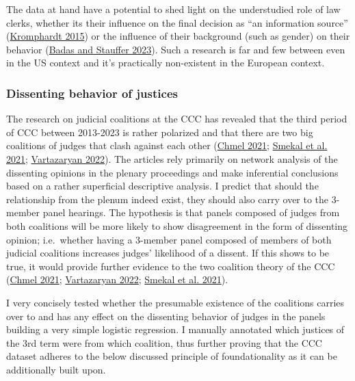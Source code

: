 \documentclass[
  11pt,
]{article}
\begin{document}
The data at hand have a potential to shed light on the understudied role
of law clerks, whether its their influence on the final decision as ``an
information source''
(\protect\hyperlink{ref-kromphardtUSSupremeCourt2015}{Kromphardt 2015})
or the influence of their background (such as gender) on their behavior
(\protect\hyperlink{ref-badasGenderAmbitionPotential2023}{Badas and
Stauffer 2023}). Such a research is far and few between even in the US
context and it's practically non-existent in the European context.

\hypertarget{dissenting-behavior-of-justices}{%
\subsubsection{Dissenting behavior of
justices}\label{dissenting-behavior-of-justices}}

The research on judicial coalitions at the CCC has revealed that the
third period of CCC between 2013-2023 is rather polarized and that there
are two big coalitions of judges that clash against each other
(\protect\hyperlink{ref-chmelCoOvlivnujeUstavni2021}{Chmel 2021};
\protect\hyperlink{ref-smekalMimopravniVlivyNa2021}{Smekal et al. 2021};
\protect\hyperlink{ref-vartazaryanSitOvaAnalyza2022}{Vartazaryan 2022}).
The articles rely primarily on network analysis of the dissenting
opinions in the plenary proceedings and make inferential conclusions
based on a rather superficial descriptive analysis. I predict that
should the relationship from the plenum indeed exist, they should also
carry over to the 3-member panel hearings. The hypothesis is that panels
composed of judges from both coalitions will be more likely to show
disagreement in the form of dissenting opinion; i.e.~whether having a
3-member panel composed of members of both judicial coalitions increases
judges' likelihood of a dissent. If this shows to be true, it would
provide further evidence to the two coalition theory of the CCC
(\protect\hyperlink{ref-chmelCoOvlivnujeUstavni2021}{Chmel 2021};
\protect\hyperlink{ref-vartazaryanSitOvaAnalyza2022}{Vartazaryan 2022};
\protect\hyperlink{ref-smekalMimopravniVlivyNa2021}{Smekal et al.
2021}).

I very concisely tested whether the presumable existence of the
coalitions carries over to and has any effect on the dissenting behavior
of judges in the panels building a very simple logistic regression. I
manually annotated which justices of the 3rd term were from which
coalition, thus further proving that the CCC dataset adheres to the
below discussed principle of foundationality as it can be additionally
built upon.
\end{document}
